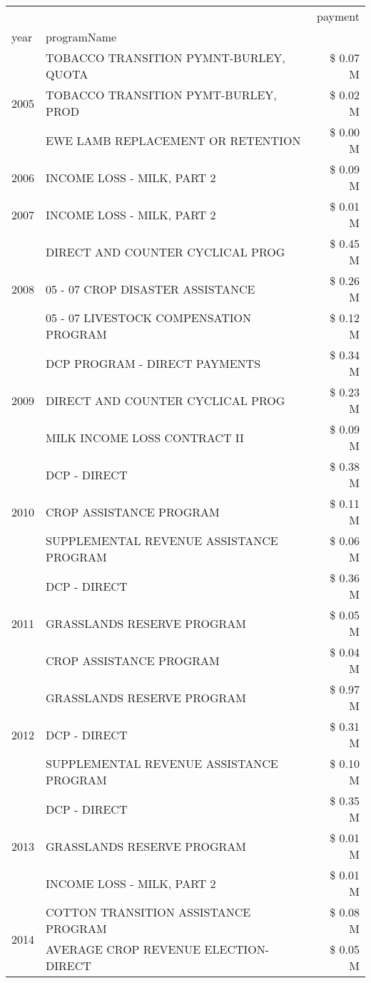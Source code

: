 \begin{tabular}{llr}
\toprule
 &  & payment \\
year & programName &  \\
\midrule
\multirow[t]{3}{*}{2005} & TOBACCO TRANSITION PYMNT-BURLEY, QUOTA & \$ 0.07 M \\
 & TOBACCO TRANSITION PYMT-BURLEY, PROD & \$ 0.02 M \\
 & EWE LAMB REPLACEMENT OR RETENTION & \$ 0.00 M \\
\cline{1-3}
2006 & INCOME LOSS - MILK, PART 2 & \$ 0.09 M \\
\cline{1-3}
2007 & INCOME LOSS - MILK, PART 2 & \$ 0.01 M \\
\cline{1-3}
\multirow[t]{3}{*}{2008} & DIRECT AND COUNTER CYCLICAL PROG & \$ 0.45 M \\
 & 05 - 07 CROP DISASTER ASSISTANCE & \$ 0.26 M \\
 & 05 - 07 LIVESTOCK COMPENSATION PROGRAM & \$ 0.12 M \\
\cline{1-3}
\multirow[t]{3}{*}{2009} & DCP PROGRAM - DIRECT PAYMENTS & \$ 0.34 M \\
 & DIRECT AND COUNTER CYCLICAL PROG & \$ 0.23 M \\
 & MILK INCOME LOSS CONTRACT II & \$ 0.09 M \\
\cline{1-3}
\multirow[t]{3}{*}{2010} & DCP - DIRECT & \$ 0.38 M \\
 & CROP ASSISTANCE PROGRAM & \$ 0.11 M \\
 & SUPPLEMENTAL REVENUE ASSISTANCE PROGRAM & \$ 0.06 M \\
\cline{1-3}
\multirow[t]{3}{*}{2011} & DCP - DIRECT & \$ 0.36 M \\
 & GRASSLANDS RESERVE PROGRAM & \$ 0.05 M \\
 & CROP ASSISTANCE PROGRAM & \$ 0.04 M \\
\cline{1-3}
\multirow[t]{3}{*}{2012} & GRASSLANDS RESERVE PROGRAM & \$ 0.97 M \\
 & DCP - DIRECT & \$ 0.31 M \\
 & SUPPLEMENTAL REVENUE ASSISTANCE PROGRAM & \$ 0.10 M \\
\cline{1-3}
\multirow[t]{3}{*}{2013} & DCP - DIRECT & \$ 0.35 M \\
 & GRASSLANDS RESERVE PROGRAM & \$ 0.01 M \\
 & INCOME LOSS - MILK, PART 2 & \$ 0.01 M \\
\cline{1-3}
\multirow[t]{3}{*}{2014} & COTTON TRANSITION ASSISTANCE PROGRAM & \$ 0.08 M \\
 & AVERAGE CROP REVENUE ELECTION-DIRECT & \$ 0.05 M \\

\end{tabular}
